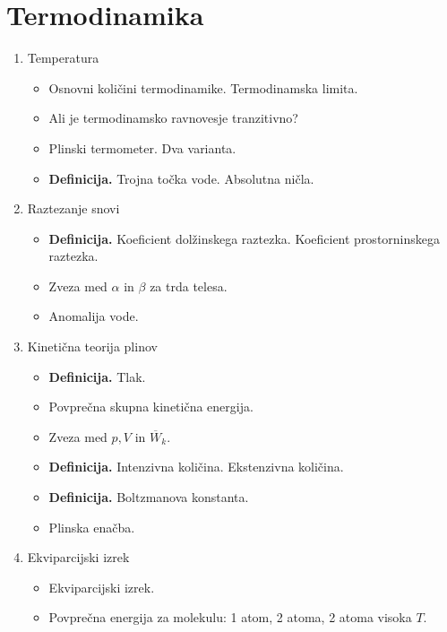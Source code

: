 \section{Termodinamika}
\begin{enumerate}
    \item Temperatura
    \begin{itemize}
        \item Osnovni količini termodinamike. Termodinamska limita.
        \item Ali je termodinamsko ravnovesje tranzitivno?
        \item Plinski termometer. Dva varianta.
        \item \textbf{Definicija.} Trojna točka vode. Absolutna ničla.
    \end{itemize}

    \item Raztezanje snovi
    \begin{itemize}
        \item \textbf{Definicija.} Koeficient dolžinskega raztezka. Koeficient prostorninskega raztezka.
        \item Zveza med \(\alpha\) in \(\beta\) za trda telesa.
        \item Anomalija vode.
    \end{itemize}

    \item Kinetična teorija plinov
    \begin{itemize}
        \item \textbf{Definicija.} Tlak.
        \item Povprečna skupna kinetična energija.
        \item Zveza med \(p, V\) in \(\overline{W}_k\).
        \item \textbf{Definicija.} Intenzivna količina. Ekstenzivna količina.
        \item \textbf{Definicija.} Boltzmanova konstanta.
        \item Plinska enačba.
    \end{itemize}

    \item Ekviparcijski izrek
    \begin{itemize}
        \item Ekviparcijski izrek.
        \item Povprečna energija za molekulu: 1 atom, 2 atoma, 2 atoma visoka \(T\).
    \end{itemize}


\end{enumerate}
